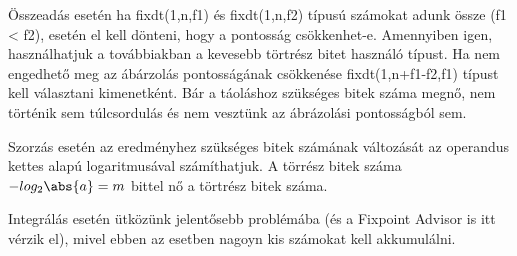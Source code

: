 Összeadás esetén ha fixdt(1,n,f1) és fixdt(1,n,f2) típusú számokat adunk össze (f1 < f2), esetén el kell dönteni, hogy a pontosság csökkenhet-e. Amennyiben igen, használhatjuk a továbbiakban a kevesebb törtrész bitet használó típust. Ha nem engedhető meg az ábárzolás pontosságának csökkenése fixdt(1,n+f1-f2,f1) típust kell választani kimenetként. Bár a táoláshoz szükséges bitek száma megnő, nem történik sem túlcsordulás és nem vesztünk az ábrázolási pontosságból sem.

Szorzás esetén az eredményhez szükséges bitek számának változását az operandus kettes alapú logaritmusával számíthatjuk. A törrész bitek száma $-log_2\abs{a} = m$ bittel nő a törtrész bitek száma.

Integrálás esetén ütközünk jelentősebb problémába (és a Fixpoint Advisor is itt vérzik el), mivel ebben az esetben nagoyn kis számokat kell akkumulálni. 